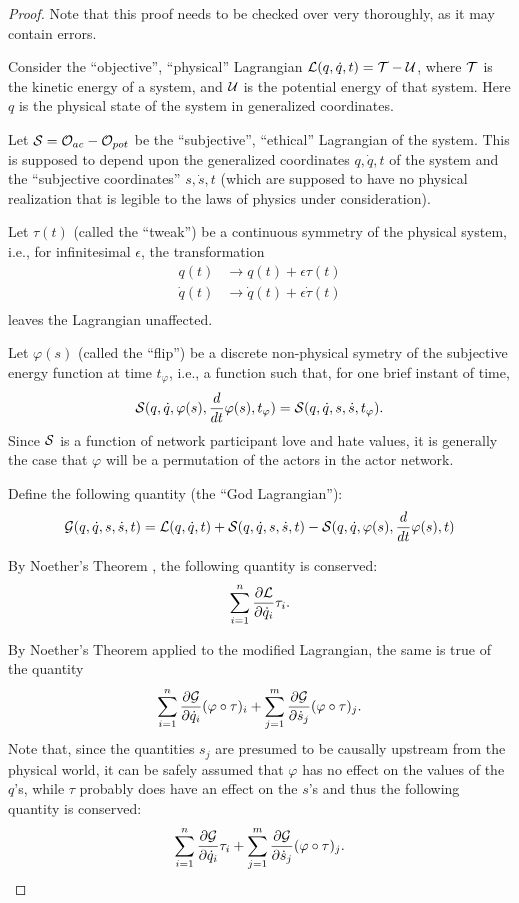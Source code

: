 \documentclass{article}
\begin{document}
\begin{proof}
  Note that this proof needs to be checked over very thoroughly, as it
  may contain errors.

  Consider the ``objective'', ``physical'' Lagrangian ${\mathcal L}(q,
  \dot{q}, t) = {\mathcal T} - {\mathcal U}$, where ${\mathcal T}$ is the kinetic energy of a
  system, and ${\mathcal U}$ is the potential energy of that system. Here $q$
  is the physical state of the system in generalized coordinates.

  Let ${\mathcal S} = {\mathcal O}_{ac} - {\mathcal O}_{pot}$ be the ``subjective'',
  ``ethical'' Lagrangian of the system. This is supposed to depend
  upon the generalized coordinates $q, \dot{q}, t$ of the system and
  the ``subjective coordinates'' $s, \dot{s}, t$ (which are supposed
  to have no physical realization that is legible to the laws of
  physics under consideration). 

  Let $\tau(t)$ (called the ``tweak'') be a continuous symmetry of the
  physical system, i.e., for infinitesimal $\epsilon$, the
  transformation
  \begin{align*}
    q(t) &\to q(t) + \epsilon \tau(t) \\
    \dot{q}(t) &\to \dot{q}(t) + \epsilon \dot{\tau}(t) \\
  \end{align*}
  leaves the Lagrangian unaffected.

  Let $\varphi(s)$ (called the ``flip'') be a discrete non-physical
  symetry of the subjective energy function at time $t_{\varphi}$,
  i.e., a function such that, for one brief instant of time,
  $${\mathcal S}(q, \dot{q}, \varphi(s), \frac{d}{dt} \varphi(s), t_{\varphi})
  = {\mathcal S}(q, \dot{q}, s, \dot{s}, t_{\varphi}).$$ Since ${\mathcal S}$ is a
  function of network participant love and hate values, it is
  generally the case that $\varphi$ will be a permutation of the
  actors in the actor network.

  Define the following quantity (the ``God Lagrangian''):
  $${\mathcal G}(q, \dot{q}, s, \dot{s}, t) = {\mathcal L}(q, \dot{q}, t) +
  {\mathcal S}(q, \dot{q}, s, \dot{s}, t) - {\mathcal S}(q, \dot{q}, \varphi(s), \frac{d}{dt}\varphi(s), t)$$

  By Noether's Theorem \cite{noether}, the following quantity is
  conserved:
  $$\sum_{i=1}^n \frac{\partial {\mathcal L}}{\partial \dot{q}_i} \tau_i.$$

  By Noether's Theorem applied to the modified Lagrangian, the same is
  true of the quantity
  $$\sum_{i=1}^n \frac{\partial {\mathcal G}}{\partial \dot{q}_i} (\varphi
  \circ \tau)_i + \sum_{j=1}^m \frac{\partial {\mathcal G}}{\partial
    \dot{s}_j} (\varphi \circ \tau)_j.$$ Note that, since the
  quantities $s_j$ are presumed to be causally upstream from the
  physical world, it can be safely assumed that $\varphi $ has no
  effect on the values of the $q$'s, while $\tau$ probably does have
  an effect on the $s$'s and thus the following quantity is conserved:
    $$\sum_{i=1}^n \frac{\partial {\mathcal G}}{\partial \dot{q}_i} \tau_i +
  \sum_{j=1}^m \frac{\partial {\mathcal G}}{\partial \dot{s}_j} (\varphi \circ
  \tau)_j.$$


\end{proof}
\end{document}
